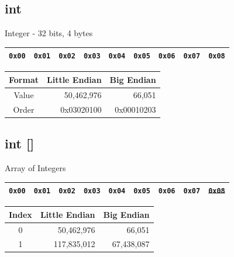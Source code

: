 \documentclass{beamer}
\begin{document}
\subsection{int}
\begin{frame}{Integer - 32 bits, 4 bytes}

\begin{table}[]
\begin{tabular}{|l|l|l|l|l|l|l|l|l|}
\hline
 \color{red}\texttt{0x00} & \color{red}\texttt{0x01} & \color{red}\texttt{0x02} & \color{red}\texttt{0x03} & \texttt{0x04} & \texttt{0x05} & \texttt{0x06} & \texttt{0x07} &
 \texttt{0x08} \\
\hline 
\end{tabular}
\end{table}

\begin{table}[]
\begin{tabular}{c r r}
Format & Little Endian & Big Endian \\
\hline
Value &  50,462,976   & 66,051 \\
Order & 0x03020100 & 0x00010203
\end{tabular}
\end{table}

\end{frame}

\subsection{int []}
\begin{frame}{Array of Integers}

\begin{table}[]
\begin{tabular}{|l|l|l|l|l|l|l|l|l|}
\hline
 \color{red}\texttt{0x00} & \color{red}\texttt{0x01} & \color{red}\texttt{0x02} & \color{red}\texttt{0x03} & \color{blue}\texttt{0x04} & \color{blue}\texttt{0x05} & \color{blue}\texttt{0x06} & \color{blue}\texttt{0x07} &
 \sout{\texttt{0x08}} \\
\hline 
\end{tabular}
\end{table}

\begin{table}[]
\begin{tabular}{c r r}
Index & Little Endian & Big Endian \\
\hline
  0 & 50,462,976 & 66,051 \\
  1 & 117,835,012  & 67,438,087
\end{tabular}
\end{table}

\end{frame}
\end{document}
